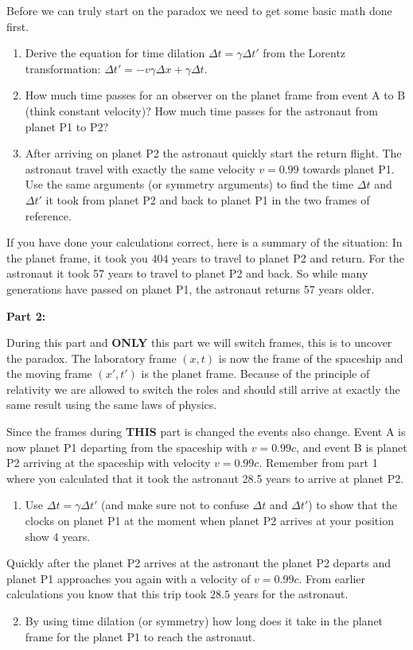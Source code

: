 {\begin{multicols}{2}
Before we can truly start on the paradox we need to get some basic math done first.
\begin{enumerate}
\item Derive the equation for time dilation $\Delta t=\gamma\Delta t'$ from the Lorentz transformation: $\Delta t'=-v\gamma \Delta x+\gamma \Delta t$.
\item How much time passes for an observer on the planet frame from event A to B (think constant velocity)? How much time passes for the astronaut from planet P1 to P2?
\item After arriving on planet P2 the astronaut quickly start the return flight. The astronaut travel with exactly the same velocity $v=0.99$ towards planet P1. Use the same arguments (or symmetry arguments) to find the time $\Delta t$ and $\Delta t'$ it took from planet P2 and back to planet P1 in the two frames of reference.
\end{enumerate}
If you have done your calculations correct, here is a summary of the situation: In the planet frame, it took you $404$ years to travel to planet P2 and return. For the astronaut it took 57 years to travel to planet P2 and back. So while many generations have passed on planet P1, the astronaut returns 57 years older.

{\bf Part 2:}

During this part and {\bf ONLY} this part we will switch frames, this is to uncover the paradox. The laboratory frame $(x,t)$ is now the frame of the spaceship and the moving frame $(x',t')$ is the planet frame. Because of the principle of relativity we are allowed to switch the roles and should still arrive at exactly the same result using the same laws of physics. 

Since the frames during {\bf THIS} part is changed the events also change. Event A is now planet P1 departing from the spaceship with $v=0.99c$, and event B is planet P2 arriving at the spaceship with velocity $v=0.99c$. Remember from part 1 where you calculated that it took the astronaut 28.5 years to arrive at planet P2.

\begin{enumerate}
\item Use $\Delta t=\gamma \Delta t'$ (and make sure not to confuse $\Delta t$ and $\Delta t'$) to show that the clocks on planet P1 at the moment when planet P2 arrives at your position show 4 years.
\end{enumerate}
Quickly after the planet P2 arrives at the astronaut the planet P2 departs and planet P1 approaches you again with a velocity of $v=0.99c$. From earlier calculations you know that this trip took $28.5$ years for the astronaut.
\begin{enumerate}
\setcounter{enumi}{1}
\item By using time dilation (or symmetry) how long does it take in the planet frame for the planet P1 to reach the astronaut.
\end{enumerate}


\end{multicols}}
